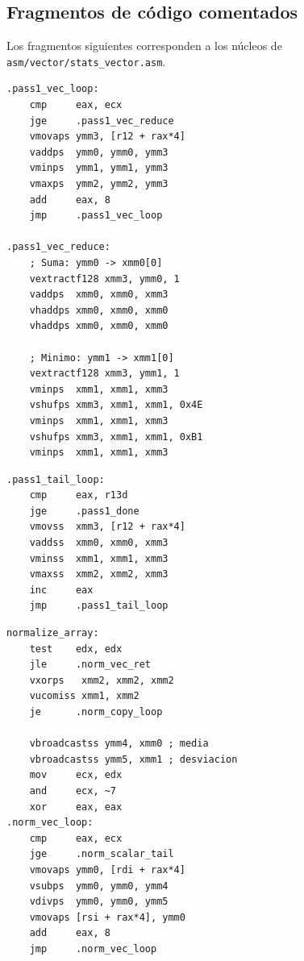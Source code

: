 \documentclass[journal]{IEEEtran}
\begin{document}
\subsection{Fragmentos de código comentados}

Los fragmentos siguientes corresponden a los núcleos de
\texttt{asm/vector/stats\_vector.asm}.

\begin{lstlisting}[language={[x86masm]Assembler},caption={Primera pasada vectorial y reducción de suma y mínimo.},label={lst:avx2-pass1}]
.pass1_vec_loop:
    cmp     eax, ecx
    jge     .pass1_vec_reduce
    vmovaps ymm3, [r12 + rax*4]
    vaddps  ymm0, ymm0, ymm3
    vminps  ymm1, ymm1, ymm3
    vmaxps  ymm2, ymm2, ymm3
    add     eax, 8
    jmp     .pass1_vec_loop

.pass1_vec_reduce:
    ; Suma: ymm0 -> xmm0[0]
    vextractf128 xmm3, ymm0, 1
    vaddps  xmm0, xmm0, xmm3
    vhaddps xmm0, xmm0, xmm0
    vhaddps xmm0, xmm0, xmm0

    ; Minimo: ymm1 -> xmm1[0]
    vextractf128 xmm3, ymm1, 1
    vminps  xmm1, xmm1, xmm3
    vshufps xmm3, xmm1, xmm1, 0x4E
    vminps  xmm1, xmm1, xmm3
    vshufps xmm3, xmm1, xmm1, 0xB1
    vminps  xmm1, xmm1, xmm3
\end{lstlisting}

\begin{lstlisting}[language={[x86masm]Assembler},caption={Bucle escalar de cierre.},label={lst:avx2-tail}]
.pass1_tail_loop:
    cmp     eax, r13d
    jge     .pass1_done
    vmovss  xmm3, [r12 + rax*4]
    vaddss  xmm0, xmm0, xmm3
    vminss  xmm1, xmm1, xmm3
    vmaxss  xmm2, xmm2, xmm3
    inc     eax
    jmp     .pass1_tail_loop
\end{lstlisting}

\begin{lstlisting}[language={[x86masm]Assembler},caption={Normalización vectorial con difusión de escalares.},label={lst:avx2-normalize}]
normalize_array:
    test    edx, edx
    jle     .norm_vec_ret
    vxorps   xmm2, xmm2, xmm2
    vucomiss xmm1, xmm2
    je      .norm_copy_loop

    vbroadcastss ymm4, xmm0 ; media
    vbroadcastss ymm5, xmm1 ; desviacion
    mov     ecx, edx
    and     ecx, ~7
    xor     eax, eax
.norm_vec_loop:
    cmp     eax, ecx
    jge     .norm_scalar_tail
    vmovaps ymm0, [rdi + rax*4]
    vsubps  ymm0, ymm0, ymm4
    vdivps  ymm0, ymm0, ymm5
    vmovaps [rsi + rax*4], ymm0
    add     eax, 8
    jmp     .norm_vec_loop
\end{lstlisting}
\end{document}
